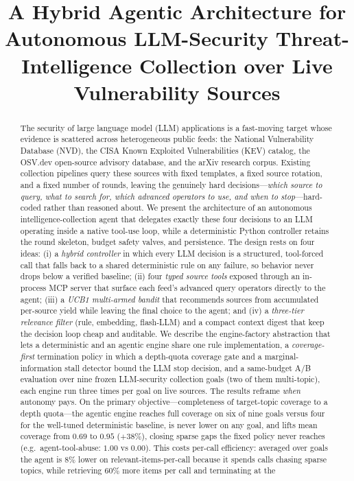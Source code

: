 \documentclass[conference]{IEEEtran}
\begin{document}
\title{A Hybrid Agentic Architecture for Autonomous LLM-Security Threat-Intelligence Collection over Live Vulnerability Sources}

\author{
}

\maketitle

\begin{abstract}
The security of large language model (LLM) applications is a fast-moving target whose evidence is scattered across heterogeneous public feeds: the National Vulnerability Database (NVD), the CISA Known Exploited Vulnerabilities (KEV) catalog, the OSV.dev open-source advisory database, and the arXiv research corpus. Existing collection pipelines query these sources with fixed templates, a fixed source rotation, and a fixed number of rounds, leaving the genuinely hard decisions---\emph{which source to query, what to search for, which advanced operators to use, and when to stop}---hard-coded rather than reasoned about. We present the architecture of an autonomous intelligence-collection agent that delegates exactly these four decisions to an LLM operating inside a native tool-use loop, while a deterministic Python controller retains the round skeleton, budget safety valves, and persistence. The design rests on four ideas: (i) a \emph{hybrid controller} in which every LLM decision is a structured, tool-forced call that falls back to a shared deterministic rule on any failure, so behavior never drops below a verified baseline; (ii) four \emph{typed source tools} exposed through an in-process MCP server that surface each feed's advanced query operators directly to the agent; (iii) a \emph{UCB1 multi-armed bandit} that recommends sources from accumulated per-source yield while leaving the final choice to the agent; and (iv) a \emph{three-tier relevance filter} (rule, embedding, flash-LLM) and a compact context digest that keep the decision loop cheap and auditable. We describe the engine-factory abstraction that lets a deterministic and an agentic engine share one rule implementation, a \emph{coverage-first} termination policy in which a depth-quota coverage gate and a marginal-information stall detector bound the LLM stop decision, and a same-budget A/B evaluation over nine frozen LLM-security collection goals (two of them multi-topic), each engine run three times per goal on live sources. The results reframe \emph{when} autonomy pays. On the primary objective---completeness of target-topic coverage to a depth quota---the agentic engine reaches full coverage on six of nine goals versus four for the well-tuned deterministic baseline, is never lower on any goal, and lifts mean coverage from $0.69$ to $0.95$ ($+38\%$), closing sparse gaps the fixed policy never reaches (e.g.\ agent-tool-abuse: $1.00$ vs $0.00$). This costs per-call efficiency: averaged over goals the agent is $8\%$ lower on relevant-items-per-call because it spends calls chasing sparse topics, while retrieving $60\%$ more items per call and terminating at the 
\end{abstract}
\end{document}
